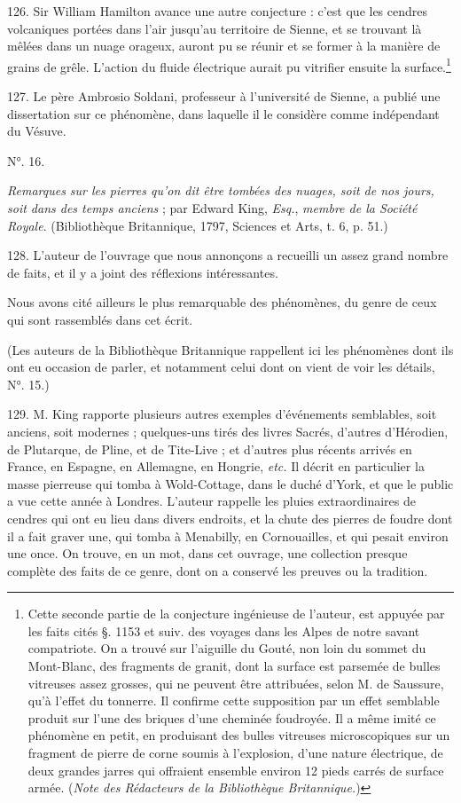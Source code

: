 \documentclass[a4paper, 11pt, oneside, polutonikogreek, french]{article}
\begin{document}
126. Sir William Hamilton avance une autre conjecture : c'est que les cendres volcaniques portées dans l'air jusqu'au territoire de Sienne, et se trouvant là mêlées dans un nuage orageux, auront pu se réunir et se former à la manière de grains de grêle. L'action du fluide électrique aurait pu vitrifier ensuite la surface.\footnote{Cette seconde partie de la conjecture ingénieuse de l'auteur, est appuyée par les faits cités §. 1153 et suiv. des voyages dans les Alpes de notre savant compatriote. On a trouvé sur l'aiguille du Gouté, non loin du sommet du Mont-Blanc, des fragments de granit, dont la surface est parsemée de bulles vitreuses assez grosses, qui ne peuvent être attribuées, selon M. de Saussure, qu'à l'effet du tonnerre. Il confirme cette supposition par un effet semblable produit sur l'une des briques d'une cheminée foudroyée. Il a même imité ce phénomène en petit, en produisant des bulles vitreuses microscopiques sur un fragment de pierre de corne soumis à l'explosion, d'une nature électrique, de deux grandes jarres qui offraient ensemble environ 12 pieds carrés de surface armée. (\emph{Note des Rédacteurs de la Bibliothèque Britannique.})}

127. Le père Ambrosio Soldani, professeur à l'université de Sienne, a publié une dissertation sur ce phénomène, dans laquelle il le considère comme indépendant du Vésuve.

\begin{center}
N°. 16.
\end{center}

\emph{Remarques sur les pierres qu'on dit être tombées des nuages, soit de nos jours, soit dans des temps anciens} ; par Edward King, \emph{Esq.}, \emph{membre de la Société Royale}. (Bibliothèque Britannique, 1797, Sciences et Arts, t. 6, p. 51.)

128. L'auteur de l'ouvrage que nous annonçons a recueilli un assez grand nombre de faits, et il y a joint des réflexions intéressantes.

Nous avons cité ailleurs le plus remarquable des phénomènes, du genre de ceux qui sont rassemblés dans cet écrit.

(Les auteurs de la Bibliothèque Britannique rappellent ici les phénomènes dont ils ont eu occasion de parler, et notamment celui dont on vient de voir les détails, N°. 15.)

129. M. King rapporte plusieurs autres exemples d'événements semblables, soit anciens, soit modernes ; quelques-uns tirés des livres Sacrés, d'autres d'Hérodien, de Plutarque, de Pline, et de Tite-Live ; et d'autres plus récents arrivés en France, en Espagne, en Allemagne, en Hongrie, \emph{etc.} Il décrit en particulier la masse pierreuse qui tomba à Wold-Cottage, dans le duché d'York, et que le public a vue cette année à Londres. L'auteur rappelle les pluies extraordinaires de cendres qui ont eu lieu dans divers endroits, et la chute des pierres de foudre dont il a fait graver une, qui tomba à Menabilly, en Cornouailles, et qui pesait environ une once. On trouve, en un mot, dans cet ouvrage, une collection presque complète des faits de ce genre, dont on a conservé les preuves ou la tradition.
\end{document}
